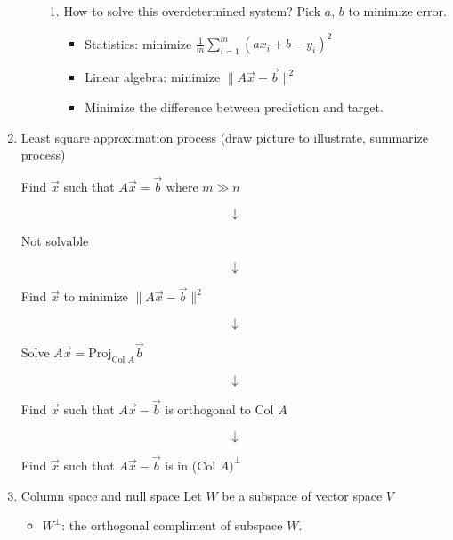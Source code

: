 \documentclass{article}
\theoremstyle{remark}
\begin{document}
\begin{enumerate}
\begin{enumerate}
\begin{enumerate}
\item How to solve this overdetermined system? Pick $a$, $b$ to minimize error. 
\begin{itemize}
\item Statistics: minimize $\displaystyle \frac{1}{m} \sum_{i=1}^m(ax_i+b-y_i)^2$
\item Linear algebra: minimize $\|A\vec x -\vec b\|^2$
\item Minimize the difference between prediction and target.
\end{itemize}
\end{enumerate}
\end{enumerate}
\item Least square approximation process (draw picture to illustrate, summarize process)
\begin{center}
Find $\vec x$ such that $A\vec x = \vec b$ where $m\gg n$
\end{center}
$$
\downarrow
$$
\begin{center}
Not solvable
\end{center}
$$
\downarrow
$$
\begin{center}
Find $\vec x$ to minimize $\|A\vec x -\vec b\|^2$
\end{center}
$$
\downarrow
$$
\begin{center}
Solve $\displaystyle A\vec x = \text{Proj}_{\text{Col } A}\vec b$
\end{center}
$$
\downarrow
$$
\begin{center}
Find $\vec x$ such that $ A\vec x-\vec b$ is orthogonal to Col $A$
\end{center}
$$
\downarrow
$$
\begin{center}
Find $\vec x$ such that $A\vec x-\vec b$ is in (Col $A)^\perp$
\end{center}
\item Column space and null space
Let $W$ be a subspace of vector space $V$
\begin{itemize}
\item $W^\perp$: the orthogonal compliment of subspace $W$.
\end{itemize}
\end{enumerate}
\end{document}
